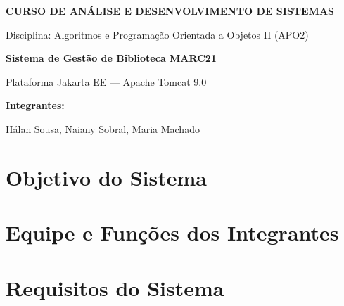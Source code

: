 \documentclass[12pt, a4paper]{article}
\begin{document}
	
	
	\begin{titlepage}
		\centering
		\vspace*{2cm}
		{\LARGE \textbf{CURSO DE ANÁLISE E DESENVOLVIMENTO DE SISTEMAS}\par}
		\vspace{0.5cm}
		{\large Disciplina: Algoritmos e Programação Orientada a Objetos II (APO2)\par}
		\vspace{3cm}
		{\Huge \textbf{Sistema de Gestão de Biblioteca MARC21}\par}
		\vspace{0.5cm}
		{\large Plataforma Jakarta EE --- Apache Tomcat 9.0\par}
		\vspace{2cm}
		{\large
			\textbf{Integrantes:}\par
			\vspace{0.5cm}
			Hálan Sousa, Naiany Sobral, Maria Machado\par
		}
		\vfill
		
	\end{titlepage}
	
	\clearpage
	
	\tableofcontents
	\newpage
	
	\section{Objetivo do Sistema}
	
	
	\section{Equipe e Funções dos Integrantes}
	
	
	\section{Requisitos do Sistema}
	
	
\end{document}
